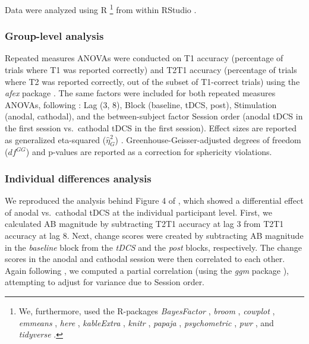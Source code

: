 \documentclass[11pt,english,]{memoir}
\let\rmarkdownfootnote\footnote%
\def\footnote{\protect\rmarkdownfootnote}
\begin{document}
Data were analyzed using R \autocite[Version 3.5.1;][]{R-base}\footnote{We, furthermore, used the R-packages \emph{BayesFactor} \autocite[Version 0.9.12.4.2;][]{R-BayesFactor}, \emph{broom} \autocite[Version 0.5.1;][]{R-broom}, \emph{cowplot} \autocite[Version 0.9.99;][]{R-cowplot}, \emph{emmeans} \autocite[Version 1.3.0;][]{R-emmeans}, \emph{here} \autocite[Version 0.1;][]{R-here}, \emph{kableExtra} \autocite[Version 1.1.0;][]{R-kableExtra}, \emph{knitr} \autocite[Version 1.21;][]{R-knitr}, \emph{papaja} \autocite[Version 0.1.0.9842;][]{R-papaja}, \emph{psychometric} \autocite[Version 2.2;][]{R-psychometric}, \emph{pwr} \autocite[Version 1.2.2;][]{R-pwr}, and \emph{tidyverse} \autocite[Version 1.2.1;][]{R-tidyverse}.} from within RStudio \autocite[Version 1.1.463;][]{RStudio2016}.

\hypertarget{group-level-analysis}{%
\subsubsection{Group-level analysis}\label{group-level-analysis}}

Repeated measures ANOVAs were conducted on T1 accuracy (percentage of trials where T1 was reported correctly) and T2\textbar{}T1 accuracy (percentage of trials where T2 was reported correctly, out of the subset of T1-correct trials) using the \emph{afex} package \autocite[Version NA;][]{R-afex}. The same factors were included for both repeated measures ANOVAs, following \textcite{London2015}: Lag (3, 8), Block (baseline, tDCS, post), Stimulation (anodal, cathodal), and the between-subject factor Session order (anodal tDCS in the first session vs.~cathodal tDCS in the first session). Effect sizes are reported as generalized eta-squared (\(\hat{\eta}^2_G\)) \autocite{Bakeman2005}. Greenhouse-Geisser-adjusted degrees of freedom (\(\mathit{df}^{GG}\)) and p-values are reported as a correction for sphericity violations.

\hypertarget{AB_tDCS-ind-diffs}{%
\subsubsection{Individual differences analysis}\label{AB_tDCS-ind-diffs}}

We reproduced the analysis behind Figure 4 of \textcite{London2015}, which showed a differential effect of anodal vs.~cathodal tDCS at the individual participant level. First, we calculated AB magnitude by subtracting T2\textbar{}T1 accuracy at lag 3 from T2\textbar{}T1 accuracy at lag 8. Next, change scores were created by subtracting AB magnitude in the \emph{baseline} block from the \emph{tDCS} and the \emph{post} blocks, respectively. The change scores in the anodal and cathodal session were then correlated to each other. Again following \textcite{London2015}, we computed a partial correlation (using the \emph{ggm} package \autocite[Version NA;][]{R-ggm}), attempting to adjust for variance due to Session order.
\end{document}
